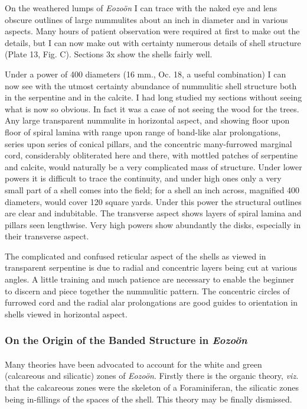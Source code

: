 \documentclass[a4paper, 12pt, oneside, landscape]{article}
\begin{document}
On the weathered lumps of \emph{Eozoön} I can trace with the naked eye and lens obscure outlines of large nummulites about an inch in diameter and in various aspects. Many hours of patient observation were required at first to make out the details, but I can now make out with certainty numerous details of shell structure (Plate 13, Fig. C). Sections 3x show the shells fairly well.

Under a power of 400 diameters (16 mm., Oc. 18, a useful combination) I can now see with the utmost certainty abundance of nummulitic shell structure both in the serpentine and in the calcite. I had long studied my sections without seeing what is now so obvious. In fact it was a case of not seeing the wood for the trees. Any large transparent nummulite in horizontal aspect, and showing floor upon floor of spiral lamina with range upon range of band-like alar prolongations, series upon series of conical pillars, and the concentric many-furrowed marginal cord, considerably obliterated here and there, with mottled patches of serpentine and calcite, would naturally be a very complicated mass of structure. Under lower powers it is difficult to trace the continuity, and under high ones only a very small part of a shell comes into the field; for a shell an inch across, magnified 400 diameters, would cover 120 square yards. Under this power the structural outlines are clear and indubitable. The transverse aspect shows layers of spiral lamina and pillars seen lengthwise. Very high powers show abundantly the disks, especially in their transverse aspect.

The complicated and confused reticular aspect of the shells as viewed in transparent serpentine is due to radial and concentric layers being cut at various angles. A little training and much patience are necessary to enable the beginner to discern and piece together the nummulitic pattern. The concentric circles of furrowed cord and the radial alar prolongations are good guides to orientation in shells viewed in horizontal aspect.

\subsubsection{On the Origin of the Banded Structure in \emph{Eozoön}}
\paragraph{}
Many theories have been advocated to account for the white and green (calcareous and silicatic) zones of \emph{Eozoön}. Firstly there is the organic theory, \emph{viz.} that the calcareous zones were the skeleton of a Foraminiferan, the silicatic zones being in-fillings of the spaces of the shell. This theory may be finally dismissed.
\end{document}
